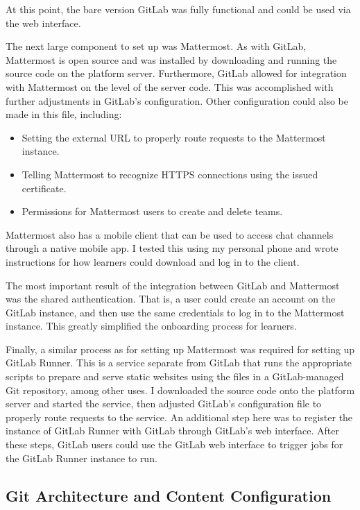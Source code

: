 \documentclass[12pt,twoside]{mitthesis}
\begin{document}
{At this point, the bare version GitLab was fully functional and could be used via the web interface.

The next large component to set up was Mattermost. As with GitLab, Mattermost is open source and was installed by downloading and running the source code on the platform server. Furthermore, GitLab allowed for integration with Mattermost on the level of the server code. This was accomplished with further adjustments in GitLab's configuration. Other configuration could also be made in this file, including:
\begin{itemize}
\item Setting the external URL to properly route requests to the Mattermost instance.
\item Telling Mattermost to recognize HTTPS connections using the issued certificate.
\item Permissions for Mattermost users to create and delete teams.
\end{itemize}
Mattermost also has a mobile client that can be used to access chat channels through a native mobile app. I tested this using my personal phone and wrote instructions for how learners could download and log in to the client.

The most important result of the integration between GitLab and Mattermost was the shared authentication. That is, a user could create an account on the GitLab instance, and then use the same credentials to log in to the Mattermost instance. This greatly simplified the onboarding process for learners.

Finally, a similar process as for setting up Mattermost was required for setting up GitLab Runner. This is a service separate from GitLab that runs the appropriate scripts to prepare and serve static websites using the files in a GitLab-managed Git repository, among other uses. I downloaded the source code onto the platform server and started the service, then adjusted GitLab's configuration file to properly route requests to the service. An additional step here was to register the instance of GitLab Runner with GitLab through GitLab's web interface. After these steps, GitLab users could use the GitLab web interface to trigger jobs for the GitLab Runner instance to run.}

\subsection{Git Architecture and Content Configuration}
\end{document}
